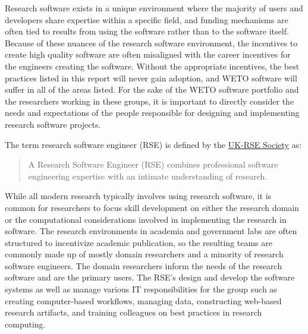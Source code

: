 \documentclass[]{nrel}
\begin{document}
\begin{appendices} %
    

    \label{app:A}

Research software exists in a unique environment where the majority of users and developers
share expertise within a specific field, and funding mechanisms are often tied to results
from using the software rather than to the software itself.
Because of these nuances of the research software environment, the incentives to create high
quality software are often misaligned with the career incentives for the engineers
creating the software.
Without the appropriate incentives, the best practices listed in this report will never gain
adoption, and WETO software will suffer in all of the areas listed.
For the sake of the WETO software portfolio and the researchers working in these groups,
it is important to directly consider the needs and expectations of the people
responsible for designing and implementing research software projects.

The term research software engineer (RSE) is defined by the
\href{https://society-rse.org/about/}{UK-RSE Society} as:

\begin{quote}
A Research Software Engineer (RSE) combines professional software engineering expertise with
an intimate understanding of research.
\end{quote}

While all modern research typically involves using research software, it is common for researchers
to focus skill development on either the research domain or the computational considerations
involved in implementing the research in software.
The research environments in academia and government labs are often structured to incentivize
academic publication, so the resulting teams are commonly made up of mostly domain researchers
and a minority of research software engineers.
The domain researchers inform the needs of the research software and are the primary users.
The RSE's design and develop the software systems as well as manage various IT responsibilities
for the group such as creating computer-based workflows, managing data, constructing web-based
research artifacts, and training colleagues on best practices in research computing.


\end{appendices}
\end{document}
